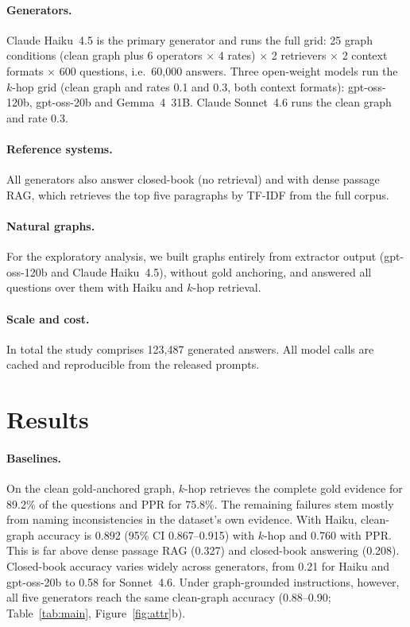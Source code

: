 \documentclass[11pt]{article}
\newcommand{\khop}{$k$-hop\xspace}
\begin{document}
\paragraph{Generators.} Claude Haiku~4.5 is the primary generator and runs the full grid: 25 graph conditions (clean graph plus 6 operators $\times$ 4 rates) $\times$ 2 retrievers $\times$ 2 context formats $\times$ 600 questions, i.e.\ 60,000 answers. Three open-weight models run the \khop grid (clean graph and rates 0.1 and 0.3, both context formats): gpt-oss-120b, gpt-oss-20b and Gemma~4~31B. Claude Sonnet~4.6 runs the clean graph and rate 0.3.

\paragraph{Reference systems.} All generators also answer closed-book (no retrieval) and with dense passage RAG, which retrieves the top five paragraphs by TF-IDF from the full corpus.

\paragraph{Natural graphs.} For the exploratory analysis, we built graphs entirely from extractor output (gpt-oss-120b and Claude Haiku~4.5), without gold anchoring, and answered all questions over them with Haiku and \khop retrieval.

\paragraph{Scale and cost.} In total the study comprises 123,487 generated answers. All model calls are cached and reproducible from the released prompts.

\section{Results}\label{sec:results}
\paragraph{Baselines.} On the clean gold-anchored graph, \khop retrieves the complete gold evidence for 89.2\% of the questions and PPR for 75.8\%. The remaining failures stem mostly from naming inconsistencies in the dataset's own evidence. With Haiku, clean-graph accuracy is 0.892 (95\% CI 0.867--0.915) with \khop and 0.760 with PPR. This is far above dense passage RAG (0.327) and closed-book answering (0.208). Closed-book accuracy varies widely across generators, from 0.21 for Haiku and gpt-oss-20b to 0.58 for Sonnet~4.6. Under graph-grounded instructions, however, all five generators reach the same clean-graph accuracy (0.88--0.90; Table~\ref{tab:main}, Figure~\ref{fig:attr}b).
\end{document}

